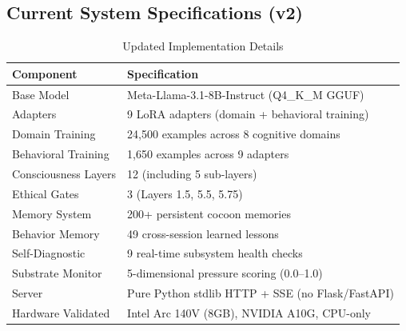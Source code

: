 



\subsection{Current System Specifications (v2)}

\begin{table}[h]
\centering
\caption{Updated Implementation Details}
\label{tab:implementation-v2}
\begin{tabular}{ll}
\toprule
\textbf{Component} & \textbf{Specification} \\
\midrule
Base Model           & Meta-Llama-3.1-8B-Instruct (Q4\_K\_M GGUF) \\
Adapters             & 9 LoRA adapters (domain + behavioral training) \\
Domain Training      & 24,500 examples across 8 cognitive domains \\
Behavioral Training  & 1,650 examples across 9 adapters \\
Consciousness Layers & 12 (including 5 sub-layers) \\
Ethical Gates        & 3 (Layers 1.5, 5.5, 5.75) \\
Memory System        & 200+ persistent cocoon memories \\
Behavior Memory      & 49 cross-session learned lessons \\
Self-Diagnostic      & 9 real-time subsystem health checks \\
Substrate Monitor    & 5-dimensional pressure scoring (0.0--1.0) \\
Server               & Pure Python stdlib HTTP + SSE (no Flask/FastAPI) \\
Hardware Validated    & Intel Arc 140V (8GB), NVIDIA A10G, CPU-only \\
\bottomrule
\end{tabular}
\end{table}


